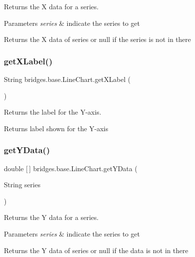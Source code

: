 Returns the X data for a series. 


\begin{DoxyParams}{Parameters}
{\em series} & indicate the series to get \\
\hline
\end{DoxyParams}
\begin{DoxyReturn}{Returns}
the X data of series or null if the series is not in there 
\end{DoxyReturn}
\mbox{\label{classbridges_1_1base_1_1_line_chart_a0885f5c62f950d96397b1704da6e2798}} 
\subsubsection{\texorpdfstring{getXLabel()}{getXLabel()}}
{\footnotesize\ttfamily String bridges.\+base.\+Line\+Chart.\+get\+X\+Label (\begin{DoxyParamCaption}{ }\end{DoxyParamCaption})}



Returns the label for the Y-\/axis. 

\begin{DoxyReturn}{Returns}
label shown for the Y-\/axis 
\end{DoxyReturn}
\mbox{\label{classbridges_1_1base_1_1_line_chart_a2bf257f45c1056808b41581af1f83645}} 
\subsubsection{\texorpdfstring{getYData()}{getYData()}}
{\footnotesize\ttfamily double \mbox{[}$\,$\mbox{]} bridges.\+base.\+Line\+Chart.\+get\+Y\+Data (\begin{DoxyParamCaption}\item[{String}]{series }\end{DoxyParamCaption})}



Returns the Y data for a series. 


\begin{DoxyParams}{Parameters}
{\em series} & indicate the series to get \\
\hline
\end{DoxyParams}
\begin{DoxyReturn}{Returns}
the Y data of series or null if the data is not in there 
\end{DoxyReturn}
\mbox{\label{classbridges_1_1base_1_1_line_chart_ad3ae17da720b1f89406ab742379ddfd6}} 
